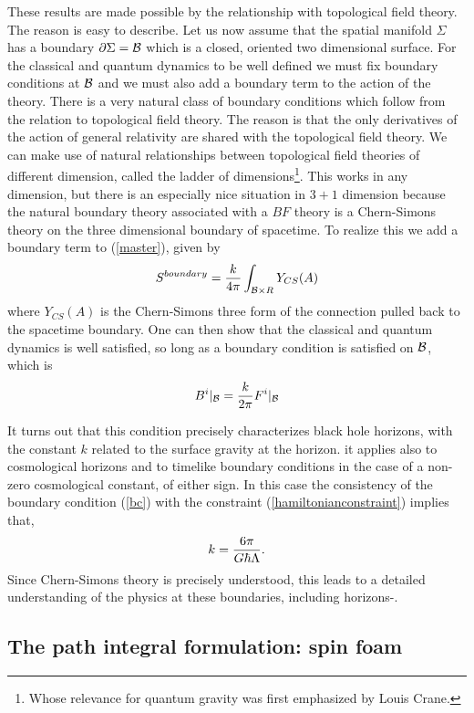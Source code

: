 \documentclass[12pt]{article}
\newcommand{\f}{\begin{equation}}
\newcommand{\ff}{\end{equation}}
\begin{document}
These results are made possible by the relationship with topological field theory. 
The reason is easy to describe. Let us now assume that the spatial manifold $\Sigma$ has
a boundary $\partial \Sigma = {\cal B}$ which is a closed, oriented two dimensional
surface.  For the classical and quantum dynamics to be well defined we must
fix boundary conditions at $\cal B$ and we must also add a boundary term to the
action of the theory.  There is a very natural class of boundary conditions which
follow from the relation to topological field theory. The reason is that the only
derivatives of the action of general relativity are shared with the  topological
field theory. We can make use of natural relationships between topological field
theories of different dimension, called the ladder of dimensions\footnote{Whose relevance
for quantum gravity was first emphasized by Louis Crane.}.  
This works in any dimension, but there is an especially nice 
situation in $3+1$ dimension because the natural boundary theory associated
with a $BF$ theory is a Chern-Simons theory on the three dimensional boundary
of spacetime.  To realize this we add a boundary term to (\ref{master}), given by
\f
S^{boundary} = {k \over 4\pi} \int_{{\cal B}\times R} Y_{CS} (A)
\ff
where $Y_{CS} (A)$ is the Chern-Simons three form of the connection pulled
back to the spacetime boundary.  One can then show that the classical and
quantum dynamics is well satisfied, so long as a boundary condition is
satisfied on $\cal B$, which is\cite{linking}
\f
B^i|_{\cal B} = {k \over 2\pi }F^i|_{\cal B} 
\label{bc}
\ff

It turns out that this condition precisely characterizes black hole horizons, with
the constant $k$ related to the surface gravity
at the horizon\cite{isolated}. it applies also to cosmological horizons\cite{linking} and to  timelike  
boundary conditions in the case of
a non-zero cosmological constant, of either sign\cite{me-holo}. In this case the consistency
of the boundary condition (\ref{bc}) with the constraint (\ref{hamiltonianconstraint}) 
implies that,
\f
k = {6\pi \over G\hbar \Lambda} .  
\ff
Since Chern-Simons theory is precisely understood, this leads to a detailed
understanding of the physics at these boundaries, including horizons\cite{linking}-\cite{me-holo}.

\subsection{The path integral formulation: spin foam}
\end{document}

